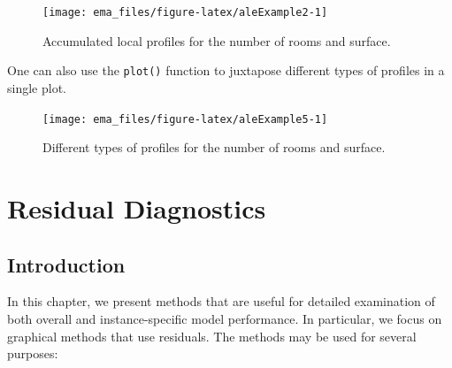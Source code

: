 \documentclass[]{krantz}
\newenvironment{Shaded}{\begin{snugshade}}{\end{snugshade}}
\newcommand{\DataTypeTok}[1]{\textcolor[rgb]{0.13,0.29,0.53}{#1}}
\newcommand{\KeywordTok}[1]{\textcolor[rgb]{0.13,0.29,0.53}{\textbf{#1}}}
\newcommand{\NormalTok}[1]{#1}
\newcommand{\OperatorTok}[1]{\textcolor[rgb]{0.81,0.36,0.00}{\textbf{#1}}}
\newcommand{\StringTok}[1]{\textcolor[rgb]{0.31,0.60,0.02}{#1}}
\begin{document}
\begin{figure}

{\centering \texttt{[image: ema\_files/figure-latex/aleExample2-1]} 

}

\caption{Accumulated local profiles for the number of rooms and surface.}\label{fig:aleExample2}
\end{figure}

One can also use the \texttt{plot()} function to juxtapose different types of profiles in a single plot.

\begin{Shaded}
\end{Shaded}

\begin{figure}

{\centering \texttt{[image: ema\_files/figure-latex/aleExample5-1]} 

}

\caption{Different types of profiles for the number of rooms and surface.}\label{fig:aleExample5}
\end{figure}

\hypertarget{residualDiagnostic}{%
\chapter{Residual Diagnostics}\label{residualDiagnostic}}

\hypertarget{IntroResidualDiagnostic}{%
\section{Introduction}\label{IntroResidualDiagnostic}}

In this chapter, we present methods that are useful for detailed examination of both overall and instance-specific model performance. In particular, we focus on graphical methods that use residuals. The methods may be used for several purposes:
\end{document}
